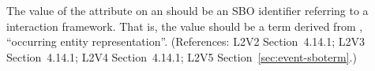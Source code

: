 The value of the  attribute on an \Event should be
an SBO identifier referring to a interaction framework.  That is, the
value should be a term derived from \sbointeractionID,
``occurring entity representation''.  (References: L2V2 Section~4.14.1; L2V3
Section~4.14.1; L2V4 Section~4.14.1; L2V5 Section~\ref{sec:event-sboterm}.)
